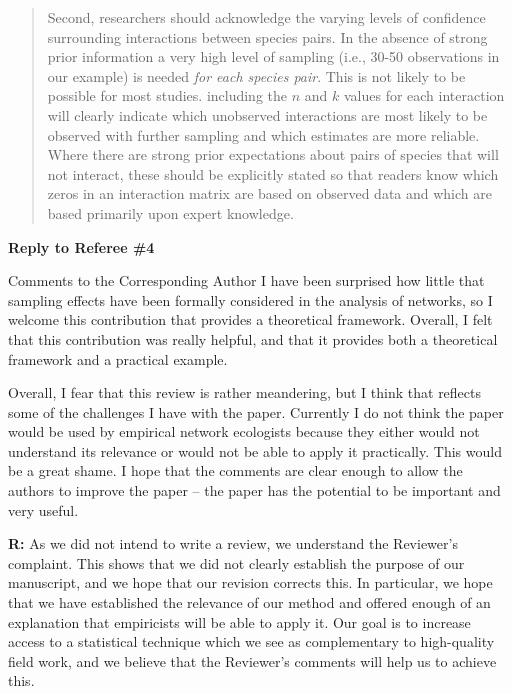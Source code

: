 \documentclass[12pt]{letter}
\newenvironment{refquote}{\bigskip \begin{it}}{\end{it}\smallskip}
\begin{document}
\begin{itemize}
		\begin{quotation}

			Second, researchers should acknowledge the varying levels of confidence surrounding interactions between species pairs. In the absence of strong prior information a very high level of sampling (i.e., 30-50 observations in our example) is needed \emph{for each species pair}. This is not likely to be possible for most studies. including the $n$ and $k$ values for each interaction will clearly indicate which unobserved interactions are most likely to be observed with further sampling and which estimates are more reliable. Where there are strong prior expectations about pairs of species that will not interact, these should be explicitly stated so that readers know which zeros in an interaction matrix are based on observed data and which are based primarily upon expert knowledge.

		\end{quotation}


\newpage

{\Large \bf Reply to Referee \#4}

	\begin{refquote}
		Comments to the Corresponding Author
		I have been surprised how little that sampling effects have been formally considered in the analysis of networks, so I welcome this contribution that provides a theoretical framework. Overall, I felt that this contribution was really helpful, and that it provides both a theoretical framework and a practical example.

		Overall, I fear that this review is rather meandering, but I think that reflects some of the challenges I have with the paper. Currently I do not think the paper would be used by empirical network ecologists because they either would not understand its relevance or would not be able to apply it practically. This would be a great shame. I hope that the comments are clear enough to allow the authors to improve the paper – the paper has the potential to be important and very useful.
		\end{refquote}

		\textbf{R:} As we did not intend to write a review, we understand the Reviewer's complaint. This shows that we did not clearly establish the purpose of our manuscript, and we hope that our revision corrects this. In particular, we hope that we have established the relevance of our method and offered enough of an explanation that empiricists will be able to apply it. Our goal is to increase access to a statistical technique which we see as complementary to high-quality field work, and we believe that the Reviewer's comments will help us to achieve this.



\end{itemize}
\end{document}
